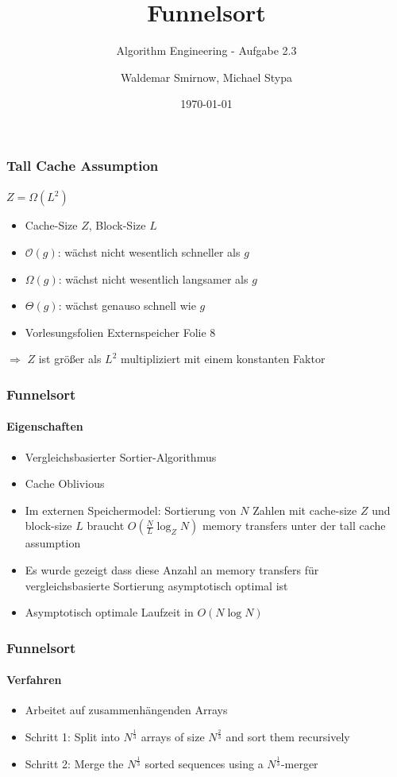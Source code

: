 \documentclass{beamer}
\title{Funnelsort}
\subtitle{Algorithm Engineering - Aufgabe 2.3}
\author{Waldemar Smirnow, Michael Stypa}
\institute{Universität Osnabrück}
\date{\today}
\begin{document}
\begin{frame}
  \titlepage
\end{frame}

\begin{frame}
  \frametitle{Tall Cache Assumption}
  \framesubtitle{}
  \begin{center}
    \Large
    $Z = \Omega\left(L^2\right)$
  \end{center}
  \begin{itemize}
    \item Cache-Size $Z$, Block-Size $L$
    \item $\mathcal{O}\left(g\right)$: wächst nicht wesentlich schneller als $g$
    \item $\Omega\left(g\right)$: wächst nicht wesentlich langsamer als $g$
    \item $\Theta\left(g\right)$: wächst genauso schnell wie $g$
    \item Vorlesungsfolien Externspeicher Folie 8
  \end{itemize}
  $\Rightarrow$ $Z$ ist größer als $L^2$ multipliziert mit einem konstanten Faktor
\end{frame}

\begin{frame}
  \frametitle{Funnelsort}
  \framesubtitle{Eigenschaften}
  \begin{itemize}
    \item Vergleichsbasierter Sortier-Algorithmus
    \item Cache Oblivious
    \item Im externen Speichermodel: Sortierung von $N$ Zahlen
      mit cache-size $Z$ und block-size $L$
      braucht $O\left(\frac{N}{L}\log_Z{N}\right)$ memory transfers
      unter der tall cache assumption
    \item Es wurde gezeigt dass diese Anzahl an memory transfers
      für vergleichsbasierte Sortierung asymptotisch optimal ist
    \item Asymptotisch optimale Laufzeit in $O\left(N\log{N}\right)$
  \end{itemize}
\end{frame}

\begin{frame}
  \frametitle{Funnelsort}
  \framesubtitle{Verfahren}
  \begin{itemize}
    \item Arbeitet auf zusammenhängenden Arrays
    \item Schritt 1: Split into $N^{\frac{1}{3}}$ arrays
      of size $N^{\frac{2}{3}}$ and sort them recursively
    \item Schritt 2: Merge the $N^{\frac{1}{3}}$ sorted sequences
      using a $N^{\frac{1}{3}}$-merger
  \end{itemize}
\end{frame}
\end{document}
